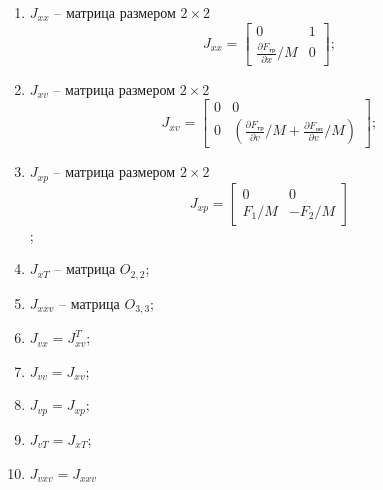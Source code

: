 \begin{enumerate}
    \item $J_{xx}$ -- матрица размером $2 \times 2$
          \begin{equation*}
              J_{xx} = \begin{bmatrix}
                  0                                         & 1 \\
                  \frac{\partial F_\text{тр}}{\partial x}/M & 0
              \end{bmatrix};
          \end{equation*}

    \item $J_{xv}$ -- матрица размером $2 \times 2$
          \begin{equation*}
              J_{xv} = \begin{bmatrix}
                  0 & 0                                                                                                     \\
                  0 & \left( \frac{\partial F_\text{тр}}{\partial v}/M  + \frac{\partial F_\text{оп}}{\partial v}/M \right)
              \end{bmatrix};
          \end{equation*}

    \item $J_{xp}$ -- матрица размером $2 \times 2$
          \begin{equation*}
              J_{xp} = \begin{bmatrix}
                  0     & 0      \\
                  F_1/M & -F_2/M
              \end{bmatrix}
          \end{equation*};

    \item $J_{xT}$ -- матрица $O_{2,2}$;

    \item $J_{xxv}$ -- матрица $O_{3,3}$;

    \item $J_{vx} = J_{xv}^T$;

    \item $J_{vv} = J_{xv}$;

    \item $J_{vp} = J_{xp}$;

    \item $J_{vT} = J_{xT}$;

    \item $J_{vxv} = J_{xxv}$


\end{enumerate}
